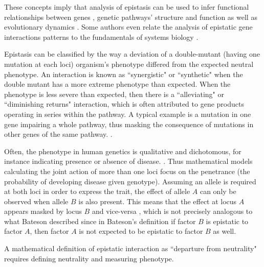 These concepts imply that analysis of epistasis can be used to infer functional relationships between genes \cite{mani2008defining}, genetic pathways' structure and function as well as evolutionary dynamics \cite{phillips2008epistasis}. 
Some authors even relate the analysis of epistatic gene interactions patterns to the fundamentals of systems biology \cite{phillips2008epistasis}.

Epistasis can be classified by the way a deviation of a double-mutant (having one mutation at each loci) organism's phenotype differed from the expected neutral phenotype\cite{mani2008defining}.
An interaction is known as ``synergistic" or ``synthetic" when the double mutant has a more extreme phenotype than expected.
When the phenotype is less severe than expected, then there is a ``alleviating" or ``diminishing returns" interaction, which is often attributed to gene products operating in series within the pathway. 
A typical example is a mutation in one gene impairing a whole pathway, thus masking the consequence of mutations in other genes of the same pathway. \cite{mani2008defining}.

Often, the phenotype in human genetics is qualitative and dichotomous, for instance indicating presence or absence of disease. \cite{cordell2002epistasis}.
Thus mathematical models calculating the joint action of more than one loci focus on the penetrance (the probability of developing disease given genotype).
Assuming an allele is required at both loci in order to express the trait, the effect of allele $A$ can only be observed when allele $B$ is also present.
This means that the effect at locus $A$ appears masked by locus $B$ and vice-versa \cite{cordell2002epistasis}, which is not precisely analogous to
what Bateson described since in Bateson's definition if factor $B$ is epistatic to factor $A$, then factor $A$ is not expected to be epistatic to factor $B$ as well.  \cite{cordell2002epistasis}

A mathematical definition of epistatic interaction as ``departure from neutrality" requires defining neutrality and measuring phenotype.

